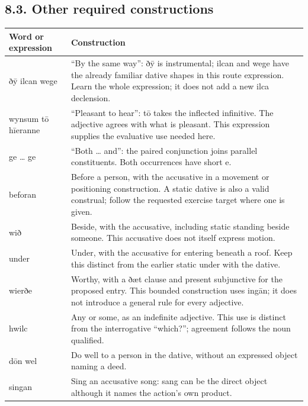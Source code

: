 \subsection*{8.3. Other required constructions}

\par\begingroup
\fontsize{10.5}{13.2}\selectfont
\setlength{\LTleft}{0pt}\setlength{\LTright}{\fill}
\noindent
\begin{tabular}{@{}>{\raggedright\arraybackslash}p{20.97mm}>{\raggedright\arraybackslash}p{100.22mm}@{}}
\toprule
\textbf{Word or expression} & \textbf{Construction} \\
\midrule
ðȳ ilcan wege & “By the same way”: ðȳ is instrumental; ilcan and wege have the already familiar dative shapes in this route expression. Learn the whole expression; it does not add a new ilca declension. \\
wynsum tō hīeranne & “Pleasant to hear”: tō takes the inflected infinitive. The adjective agrees with what is pleasant. This expression supplies the evaluative use needed here. \\
ge … ge & “Both … and”: the paired conjunction joins parallel constituents. Both occurrences have short e. \\
beforan & Before a person, with the accusative in a movement or positioning construction. A static dative is also a valid construal; follow the requested exercise target where one is given. \\
wið & Beside, with the accusative, including static standing beside someone. This accusative does not itself express motion. \\
under & Under, with the accusative for entering beneath a roof. Keep this distinct from the earlier static under with the dative. \\
wierðe & Worthy, with a ðæt clause and present subjunctive for the proposed entry. This bounded construction uses ingān; it does not introduce a general rule for every adjective. \\
hwilc & Any or some, as an indefinite adjective. This use is distinct from the interrogative “which?”; agreement follows the noun qualified. \\
dōn wel & Do well to a person in the dative, without an expressed object naming a deed. \\
singan & Sing an accusative song: sang can be the direct object although it names the action’s own product. \\
\bottomrule
\end{tabular}
\par\endgroup

